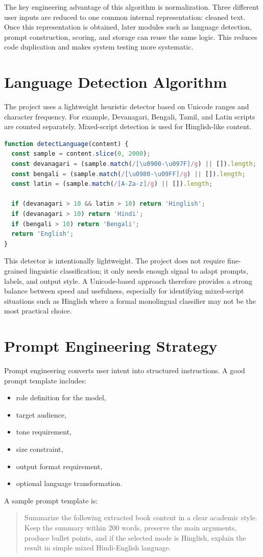 \documentclass[12pt, a4paper]{report}
\begin{document}
The key engineering advantage of this algorithm is normalization. Three different user inputs are reduced to one common internal representation: cleaned text. Once this representation is obtained, later modules such as language detection, prompt construction, scoring, and storage can reuse the same logic. This reduces code duplication and makes system testing more systematic.

\section{Language Detection Algorithm}
The project uses a lightweight heuristic detector based on Unicode ranges and character frequency. For example, Devanagari, Bengali, Tamil, and Latin scripts are counted separately. Mixed-script detection is used for Hinglish-like content.

\begin{lstlisting}[language=JavaScript,caption={Simplified Unicode-Based Language Detection Logic}]
function detectLanguage(content) {
  const sample = content.slice(0, 2000);
  const devanagari = (sample.match(/[\u0900-\u097F]/g) || []).length;
  const bengali = (sample.match(/[\u0980-\u09FF]/g) || []).length;
  const latin = (sample.match(/[A-Za-z]/g) || []).length;

  if (devanagari > 10 && latin > 10) return 'Hinglish';
  if (devanagari > 10) return 'Hindi';
  if (bengali > 10) return 'Bengali';
  return 'English';
}
\end{lstlisting}

This detector is intentionally lightweight. The project does not require fine-grained linguistic classification; it only needs enough signal to adapt prompts, labels, and output style. A Unicode-based approach therefore provides a strong balance between speed and usefulness, especially for identifying mixed-script situations such as Hinglish where a formal monolingual classifier may not be the most practical choice.

\section{Prompt Engineering Strategy}
Prompt engineering converts user intent into structured instructions. A good prompt template includes:
\begin{itemize}
  \item role definition for the model,
  \item target audience,
  \item tone requirement,
  \item size constraint,
  \item output format requirement,
  \item optional language transformation.
\end{itemize}
A sample prompt template is:
\begin{quote}
  Summarize the following extracted book content in a clear academic style. Keep the summary within 200 words, preserve the main arguments, produce bullet points, and if the selected mode is Hinglish, explain the result in simple mixed Hindi-English language.
\end{quote}
\end{document}

